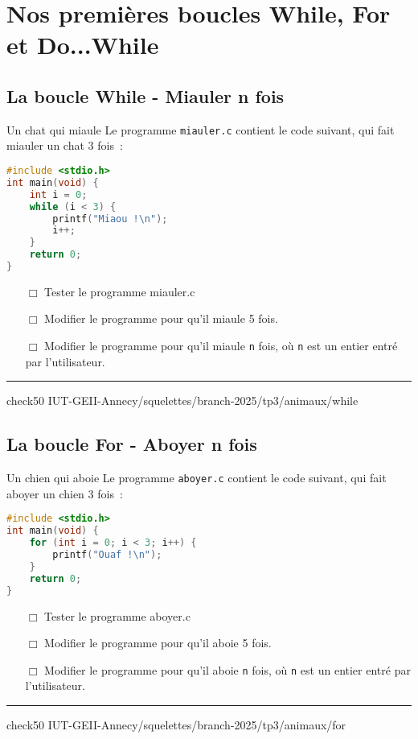 
\section{Nos premières boucles While, For et Do...While}

\subsection{La boucle While - Miauler n fois}

\begin{UPSTIManipulation}{Un chat qui miaule}
	Le programme \texttt{miauler.c} contient le code suivant, qui fait miauler un chat 3 fois :
	\begin{lstlisting}[language=c]
#include <stdio.h>
int main(void) {
    int i = 0;
    while (i < 3) {
        printf("Miaou !\n");
        i++;
    }
    return 0;
}
\end{lstlisting}
	\begin{itemize}
		\item[$\Box$] Tester le programme miauler.c
		\item[$\Box$] Modifier le programme pour qu'il miaule 5 fois.
		\item[$\Box$] Modifier le programme pour qu'il miaule \texttt{n} fois, où \texttt{n} est un entier entré par l'utilisateur.
	\end{itemize}
	\hrule
	check50 IUT-GEII-Annecy/squelettes/branch-2025/tp3/animaux/while
\end{UPSTIManipulation}


\subsection{La boucle For - Aboyer n fois}

\begin{UPSTIManipulation}{Un chien qui aboie}
	Le programme \texttt{aboyer.c} contient le code suivant, qui fait aboyer un chien 3 fois :
	\begin{lstlisting}[language=c]
#include <stdio.h>   
int main(void) {
    for (int i = 0; i < 3; i++) {
        printf("Ouaf !\n");
    }
    return 0;
}
\end{lstlisting}
	\begin{itemize}
		\item[$\Box$] Tester le programme aboyer.c
		\item[$\Box$] Modifier le programme pour qu'il aboie 5 fois.
		\item[$\Box$] Modifier le programme pour qu'il aboie \texttt{n} fois, où \texttt{n} est un entier entré par l'utilisateur.
	\end{itemize}
	\hrule
	check50 IUT-GEII-Annecy/squelettes/branch-2025/tp3/animaux/for
\end{UPSTIManipulation}


